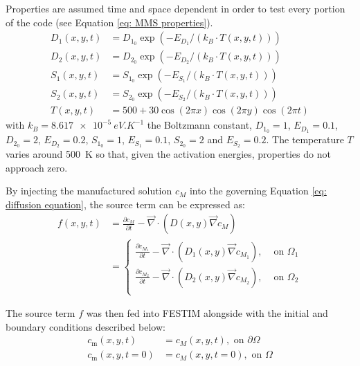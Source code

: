 Properties are assumed time and space dependent in order to test every portion of the code (see Equation \ref{eq: MMS properties}).
\begin{subequations}
    \begin{align}
        D_1(x, y, t) & =  D_{1_0} \exp(-E_{D_1}/(k_B \cdot T(x,y, t) )) \\
        D_2(x, y, t) & =  D_{2_0} \exp(-E_{D_2}/(k_B \cdot T(x,y, t) )) \\
        S_1(x, y, t) & =  S_{1_0} \exp(-E_{S_1}/(k_B \cdot T(x,y, t) )) \\
        S_2(x, y, t) & =  S_{2_0} \exp(-E_{S_2}/(k_B \cdot T(x,y, t) )) \\
        T(x, y, t) & = 500 + 30 \cos(2\pi x) \cos(2 \pi y) \cos(2 \pi t)
\end{align} \label{eq: MMS properties}
\end{subequations}
with ${k_B = \SI{8.617e-5}{eV.K^{-1}}}$ the Boltzmann constant, $D_{1_0} = 1$, $E_{D_1} = 0.1$, $D_{2_0} = 2$, $E_{D_2} = 0.2$, $S_{1_0} = 1$, $E_{S_1} = 0.1$, $S_{2_0} = 2$ and $E_{S_2} = 0.2$.
The temperature $T$ varies around \SI{500}{K} so that, given the activation energies, properties do not approach zero.

By injecting the manufactured solution $c_M$ into the governing Equation \ref{eq: diffusion equation}, the source term can be expressed as:
\begin{align}
    f(x, y, t) &= \frac{\partial c_M}{\partial t} - \vec{\nabla} \cdot\left(D(x, y)
    \vec{\nabla}c_M\right) \nonumber \\
    &= \begin{cases}
        \frac{\partial c_{M_1}}{\partial t} - \vec{\nabla} \cdot\left(D_1(x, y)
    \vec{\nabla}c_{M_1}\right),& \text{ on } \Omega_1\\
    \frac{\partial c_{M_2}}{\partial t} - \vec{\nabla} \cdot\left(D_2(x, y)
    \vec{\nabla}c_{M_2}\right),& \text{ on } \Omega_2\\
    \end{cases}
\end{align}

The source term $f$ was then fed into FESTIM alongside with the initial and boundary conditions described below:
\begin{subequations}
    \begin{align}
        c_\mathrm{m}(x, y, t) &= c_M(x, y, t), \text{ on } \partial \Omega \\
        c_\mathrm{m}(x, y, t=0) &= c_M(x, y, t=0), \text{ on } \Omega
    \end{align}
\end{subequations}

